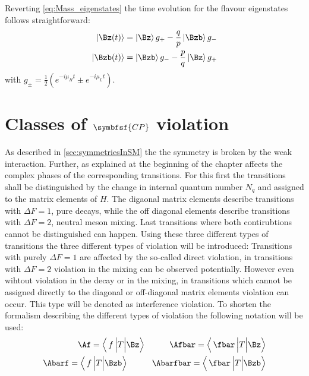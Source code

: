 Reverting \cref{eq:Mass_eigenstates} the time evolution for the flavour eigenstates follows straightforward:
\begin{equation}
\begin{split}
\left|\Bz\!\left(t\right)\right>&=\left|\Bz\right>g_+-\frac{q}{p}\left|\Bzb\right>g_-\\
\left|\Bzb\!\left(t\right)\right>&=\left|\Bzb\right>g_--\frac{p}{q}\left|\Bz\right>g_+ \label{eq:timeEvolution}
\end{split}
\end{equation}
with $g_\pm=\frac{1}{2}\left(e^{-i\mu_Ht}\pm e^{-i\mu_Lt}\right)$.

\section[head={Types of \CP violation},tocentry={Classes of \CP violation}]{Classes of $\symbfsf{C{}P}$ violation}
\label{sec:CPVClasses}

As described in \cref{sec:symmetriesInSM} the the \CP symmetry is broken by the weak interaction.
Further, as explained at the beginning of the chapter \CP affects the complex phases of the corresponding transitions.
For this first the transitions shall be distinguished by the change in internal quantum number $N_q$ and assigned to the matrix elements of $H$.
The digaonal matrix elements describe transitions with $\Delta F=1$, \ie pure decays, while the off diagonal elements describe transitions with $\Delta F=2$, \ie neutral meson mixing.
Last transitions where both contirubtions cannot be distinguished can happen.
Using these three different types of transitions the three different types of \CP violation will be introduced:
Transitions with purely $\Delta F=1$ are affected by the so-called direct \CP violation, in transitions with $\Delta F=2$ \CP violation in the mixing can be observed potentially.
However even wihtout \CP violation in the decay or in the mixing, in transitions which cannot be assigned directly to the diagonal or off-diagonal matrix elements \CP violation can occur.
This type will be denoted as interference \CP violation.
To shorten the formalism describing the different types of \CP violation the following notation will be used:
\begin{equation}
\begin{split}
\Af = \left<\,f\,\Big|T\Big|\Bz\right>\hspace{1cm}\Afbar = \left<\,\fbar\,\Big|T\Big|\Bz\right>\\
\Abarf = \left<\,f\,\Big|T\Big|\Bzb\right>\hspace{1cm}\Abarfbar = \left<\,\fbar\,\Big|T\Big|\Bzb\right>
\end{split}
\end{equation}


